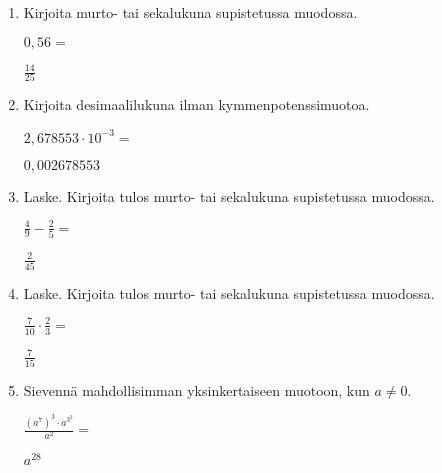 \documentclass[finnish, a4paper, 12pt]{article}
\begin{document}
	\begin{enumerate}[leftmargin=*]
		\setlength\itemsep{1em}
		
		\item %
		Kirjoita murto- tai sekalukuna supistetussa muodossa. 
		
		\(
		0{,}56 = 
		\) %
		
		\begin{version:withAnswers}
		\( \frac{14}{25} \)
		\end{version:withAnswers}

		\vspace{8pt}
		
		\item %
		Kirjoita desimaalilukuna ilman kymmenpotenssimuotoa. 
		
		\(
		2{,}678553\cdot 10^{-3} = 
		\) %
		\begin{version:withAnswers}
		\( 0,002678553 \)
		\end{version:withAnswers}	
		\vspace{8pt}
		
		\item %
		Laske. Kirjoita tulos murto- tai sekalukuna supistetussa muodossa.
		
		\(
		\displaystyle
		\frac{4}{9}-\frac{2}{5} = 
		\) %
		\begin{version:withAnswers}
		\( \frac{2}{45} \)
		\end{version:withAnswers}	
		
		\vspace{8pt}
		
		\item %
		Laske. Kirjoita tulos murto- tai sekalukuna supistetussa muodossa.
		
		\(
		\displaystyle
		\frac{7}{10}\cdot\frac{2}{3} = 
		\) %
		\begin{version:withAnswers}
		\( \frac{7}{15} \)
		\end{version:withAnswers}
		
		\vspace{8pt}
		
		\item %
		Sievennä mahdollisimman yksinkertaiseen muotoon, kun \(a \not = 0\). 
		
		\(
		\displaystyle
		\frac{\left(a^7\right)^3 \cdot a^{3^2}}{a^2} =
		\phantom{mmmmmmmmmmmmmmm}
		\) %
		\begin{version:withAnswers}
		\(  a^{28} \)
		\end{version:withAnswers}
		

\end{enumerate}
\end{document}

